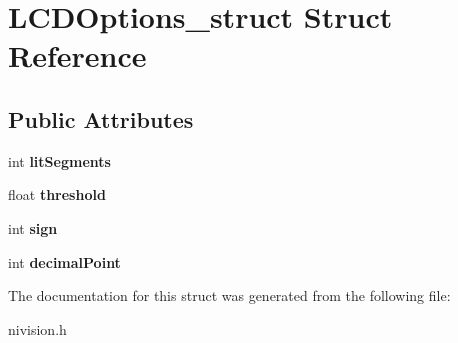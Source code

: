 \hypertarget{structLCDOptions__struct}{\section{\-L\-C\-D\-Options\-\_\-struct \-Struct \-Reference}
\label{structLCDOptions__struct}
}
\subsection*{\-Public \-Attributes}
\begin{DoxyCompactItemize}
\item 
\hypertarget{structLCDOptions__struct_a0a27e9d50a79477eaca4cd315559c48a}{int {\bfseries lit\-Segments}}\label{structLCDOptions__struct_a0a27e9d50a79477eaca4cd315559c48a}

\item 
\hypertarget{structLCDOptions__struct_ac418dbf2acd613acfeef9f53d06b0399}{float {\bfseries threshold}}\label{structLCDOptions__struct_ac418dbf2acd613acfeef9f53d06b0399}

\item 
\hypertarget{structLCDOptions__struct_ac60122b89ac6093118312df8044eb318}{int {\bfseries sign}}\label{structLCDOptions__struct_ac60122b89ac6093118312df8044eb318}

\item 
\hypertarget{structLCDOptions__struct_a9d5e40201b26de32f3c944dfd02a85ac}{int {\bfseries decimal\-Point}}\label{structLCDOptions__struct_a9d5e40201b26de32f3c944dfd02a85ac}

\end{DoxyCompactItemize}


\-The documentation for this struct was generated from the following file\-:\begin{DoxyCompactItemize}
\item 
nivision.\-h\end{DoxyCompactItemize}
